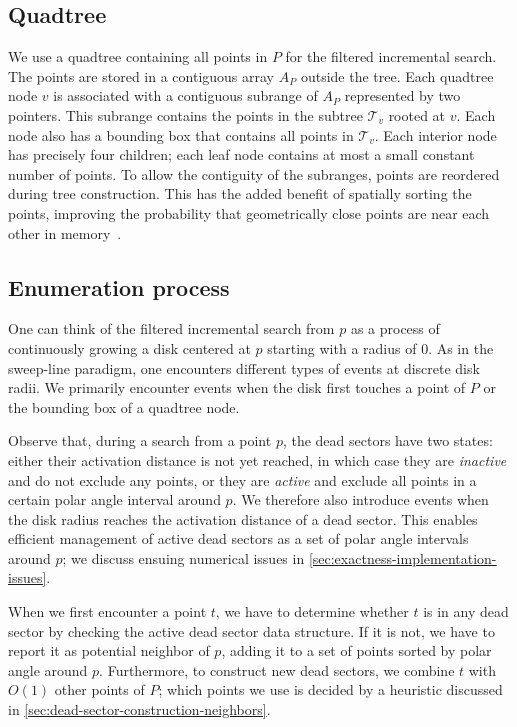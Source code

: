 \subsection{Quadtree}
We use a quadtree containing all points in $P$ for the filtered incremental search.
The points are stored in a contiguous array $A_P$ outside the tree.
Each quadtree node $v$ is associated with a contiguous subrange of $A_P$ represented by two pointers.
This subrange contains the points in the subtree $\mathcal{T}_v$ rooted at $v$.
Each node also has a bounding box that contains all points in $\mathcal{T}_v$.
Each interior node has precisely four children; each leaf node contains at most a small constant number of points.
To allow the contiguity of the subranges, points are reordered during tree construction.
This has the added benefit of spatially sorting the points,
improving the probability that geometrically close points are near each other in memory~\cite{haasmwt}.

\subsection{Enumeration process}
One can think of the filtered incremental search from $p$ as a process of continuously growing a disk centered at $p$ starting with a radius of $0$.
As in the sweep-line paradigm, one encounters different types of events at discrete disk radii.
We primarily encounter events when the disk first touches a point of $P$ or the bounding box of a quadtree node.

Observe that, during a search from a point $p$, the dead sectors have two states:
either their activation distance is not yet reached, in which case they are \emph{inactive} and do not exclude any points,
or they are \emph{active} and exclude all points in a certain polar angle interval around $p$.
We therefore also introduce events when the disk radius reaches the activation distance of a dead sector.
This enables efficient management of active dead sectors as a set of polar angle intervals around $p$;
we discuss ensuing numerical issues in \cref{sec:exactness-implementation-issues}.

When we first encounter a point $t$, we have to determine whether $t$ is in any dead sector by checking the active dead sector data structure.
If it is not, we have to report it as potential neighbor of $p$, adding it to a set of points sorted by polar angle around $p$.
Furthermore, to construct new dead sectors, we combine $t$ with $O(1)$ other points of $P$;
which points we use is decided by a heuristic discussed in \cref{sec:dead-sector-construction-neighbors}.

